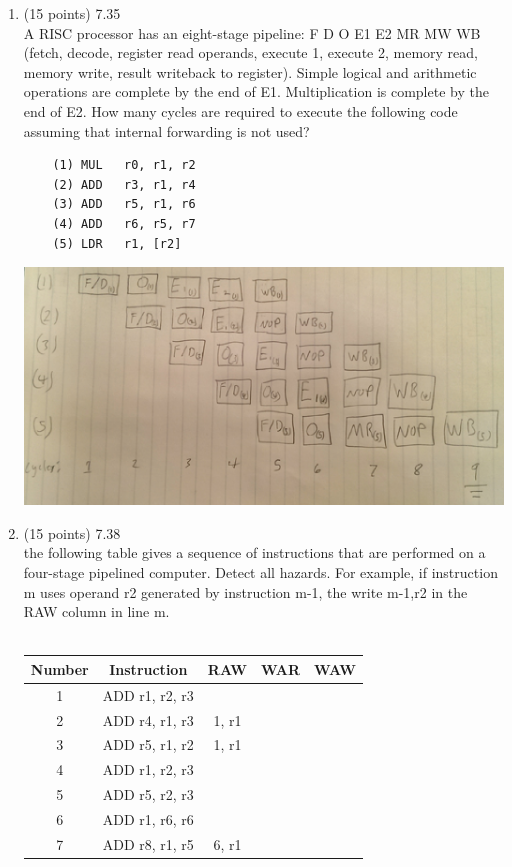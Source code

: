 \documentclass[letterpaper,10pt,onecolumn,titlepage]{article}
\begin{document}
\begin{enumerate}
\item (15 points) 7.35 \\
	A RISC processor has an eight-stage pipeline: F D O E1 E2 MR MW WB (fetch, decode,
	register read operands, execute 1, execute 2, memory read, memory write, result
	writeback to register). Simple logical and arithmetic operations are complete by
	the end of E1. Multiplication is complete by the end of E2. How many cycles are
	required to execute the following code assuming that internal forwarding is not
	used?
	\begin{verbatim}
	(1) MUL   r0, r1, r2
	(2) ADD   r3, r1, r4
	(3) ADD   r5, r1, r6
	(4) ADD   r6, r5, r7
	(5) LDR   r1, [r2]
	\end{verbatim}
	\includegraphics[width=5in]{images/7_35.eps}

\item (15 points) 7.38 \\
	the following table gives a sequence of instructions that are performed on a
	four-stage pipelined computer. Detect all hazards. For example, if instruction m
	uses operand r2 generated by instruction m-1, the write m-1,r2 in the RAW column
	in line m. \\
	\\
	\begin{tabular}{ c c c c c }
		Number & Instruction & RAW & WAR & WAW \\
		\hline
		1 & ADD r1, r2, r3 &        &        &        \\
		2 & ADD r4, r1, r3 & 1, r1  &        &        \\
		3 & ADD r5, r1, r2 & 1, r1  &        &        \\
		4 & ADD r1, r2, r3 &        &        &        \\
		5 & ADD r5, r2, r3 &        &        &        \\
		6 & ADD r1, r6, r6 &        &        &        \\
		7 & ADD r8, r1, r5 & 6, r1  &        &        \\
	\end{tabular}\\

\end{enumerate}
\end{document}
